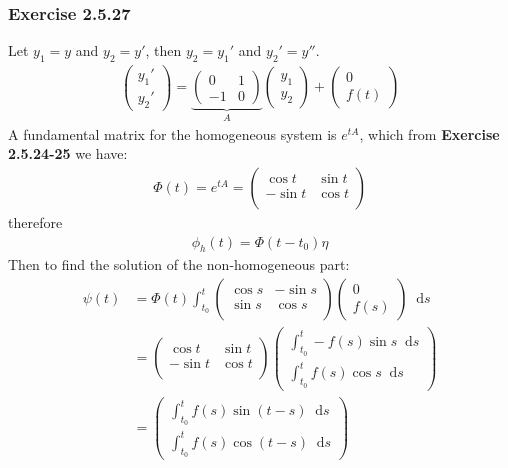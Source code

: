 \documentclass[12pt, letterpaper]{scrartcl}
\newcommand*\diff{\mathop{}\!\mathrm{d}}
\begin{document}
\subsubsection*{Exercise 2.5.27}
Let $y_1=y$ and $y_2=y'$, then $y_2=y_1'$ and $y_2'=y''$.
\begin{align*}
    \left(\begin{array}{c}
        y_1' \\
        y_2'
    \end{array}\right)
    =
    \underbrace{\left(\begin{array}{cc}
        0 & 1 \\
        -1 & 0 
    \end{array}\right)}_{A}
    \left(\begin{array}{c}
        y_1 \\
        y_2
    \end{array}\right)
    +
    \left(\begin{array}{c}
        0 \\
        f(t)
    \end{array}\right)
\end{align*}
A fundamental matrix for the homogeneous system is $e^{tA}$, which from \textbf{Exercise 2.5.24-25} we have:
\begin{align*}
    \Phi(t)=e^{tA}=\left(\begin{array}{cc}
        \cos t & \sin t \\
        -\sin t & \cos t \\
    \end{array}\right)
\end{align*}
therefore
\begin{align*}
    \phi_h(t)=\Phi(t-t_0)\eta
\end{align*}
Then to find the solution of the non-homogeneous part:
\begin{align*}
    \psi(t)&=\Phi(t)\int_{t_0}^t
    \left(\begin{array}{cc}
        \cos s & -\sin s \\
        \sin s & \cos s \\
    \end{array}\right)
    \left(\begin{array}{c}0\\f(s)\end{array}\right)\diff s\\
    &=\left(\begin{array}{cc}
        \cos t & \sin t \\
        -\sin t & \cos t \\
    \end{array}\right)
    \left(\begin{array}{c}
        \int_{t_0}^t-f(s)\sin s\diff s\\
        \int_{t_0}^tf(s)\cos s\diff s
    \end{array}\right)\\
    &=
    \left(\begin{array}{c}
        \int_{t_0}^tf(s)\sin(t-s)\diff s\\
        \int_{t_0}^tf(s)\cos(t-s)\diff s
    \end{array}\right)
\end{align*}
\end{document}
